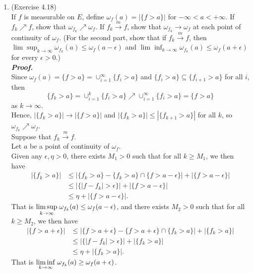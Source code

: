 \documentclass[a4paper,11pt]{article}
\begin{document}
\begin{enumerate}
\item (Exercise 4.18)\\
If $f$ is measurable on $E$, define $\omega_f(a) = |\{ f > a \}|$ for $-\infty<a<+\infty$. If $f_k \nearrow f$, show that $\omega_{f_k} \nearrow \omega_f$. If $f_k \overset{m}{\to} f$, show that $\omega_{f_k} \to \omega_f$ at each point of continuity of $\omega_f$. (For the second part, show that if $f_k \overset{m}{\to} f$, then $\lim \sup_{k \to \infty} \omega_{f_k} (a) \leq \omega_f (a - \epsilon)$ and $\lim \inf_{k \to \infty} \omega_{f_k} (a) \leq \omega_f (a + \epsilon)$ for every $\epsilon > 0$.)\\
\newline
\textit{\textbf {Proof.}}\\
Since $\omega_f(a) = \{ f > a \} = \cup_{i=1}^{\infty} \{ f_i > a \}$ and $\{ f_i > a \} \subseteq \{ f_{i+1} > a \}$ for all $i$, then
$$\{ f_k > a \} = \cup_{i=1}^k \{ f_i > a \} \nearrow \cup_{i=1}^{\infty} \{ f_i > a \} = \{ f > a \}$$
as $k \to \infty$.\\
Hence, $|\{ f_k > a \}| \to |\{ f > a\}|$ and $|\{ f_k > a \}| \leq |\{ f_{k+1} > a\}|$ for all $k$, so $\omega_{f_k} \nearrow \omega_f$.\\
Suppose that $f_k \overset{m}{\to} f$.\\
Let $a$ be a point of continuity of $\omega_f$.\\
Given any $\epsilon, \eta > 0$, there exists $M_1 > 0$ such that for all $k \geq M_1$, we then have
$$\begin{aligned}
|\{ f_k > a\}|
& \leq |\{ f_k > a\} - \{ f_k > a \} \cap \{ f > a - \epsilon \}| + |\{ f > a - \epsilon \}|\\
& \leq |\{ |f - f_k| > \epsilon\}| + |\{ f > a - \epsilon \}|\\
& \leq \eta + |\{ f > a - \epsilon \}|.
\end{aligned}$$
That is $\underset{k \to \infty}{\lim \sup} \hspace{0.1cm} \omega_{f_k}(a) \leq \omega_f (a - \epsilon)$, and there exists $M_2 > 0$ such that for all $k \geq M_2$, we then have
$$\begin{aligned}
|\{ f > a + \epsilon\}|
& \leq |\{ f > a + \epsilon\} - \{ f > a + \epsilon \} \cap \{ f_k > a \}| + |\{ f_k > a \}|\\
& \leq |\{ |f - f_k| > \epsilon\}| + |\{ f_k > a \}|\\
& \leq \eta + |\{ f_k > a \}|.
\end{aligned}$$
That is $\underset{k \to \infty}{\lim \inf} \hspace{0.1cm} \omega_{f_k} (a) \geq \omega_f (a + \epsilon)$.\\

\end{enumerate}
\end{document}
